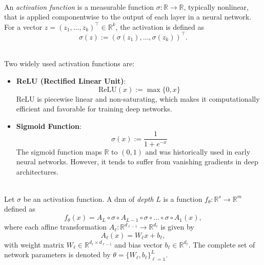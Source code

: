 \begin{definition} \ \\
An \emph{activation function} is a measurable function $\sigma : \mathbb{R} \to \mathbb{R}$, typically nonlinear, that is applied componentwise to the output of each layer in a neural network. For a vector $z = (z_1, \dots, z_k)^\top \in \mathbb{R}^k$, the activation is defined as
\begin{equation*}
    \sigma(z) := (\sigma(z_1), \dots, \sigma(z_k))^\top.
\end{equation*}
\end{definition}

\begin{example} \ \\
Two widely used activation functions are:
\begin{itemize}
    \item \textbf{ReLU (Rectified Linear Unit)}:
    \begin{equation*}
        \mathrm{ReLU}(x) := \max\{0, x\}
    \end{equation*}
    ReLU is piecewise linear and non-saturating, which makes it computationally
    efficient and favorable for training deep networks.

    \item \textbf{Sigmoid Function}:
    \begin{equation*}
        \sigma(x) := \frac{1}{1 + e^{-x}}
    \end{equation*}
    The sigmoid function maps $\mathbb{R}$ to $(0, 1)$ and was historically used
    in early neural networks. However, it tends to suffer from vanishing
    gradients in deep architectures.
\end{itemize}
\end{example}

\begin{definition} \ \\
Let $\sigma$ be an activation function. A \ac{dnn} of \emph{depth} $L$ is a
function $f_\theta: \mathbb{R}^s \to \mathbb{R}^m$ defined as
\begin{equation*}
    f_\theta(x) = A_L \circ \sigma \circ A_{L-1} \circ \sigma \circ \dots \circ \sigma \circ A_1(x),
\end{equation*}
where each affine transformation $A_\ell: \mathbb{R}^{d_{\ell-1}} \to
\mathbb{R}^{d_\ell}$ is given by
\begin{equation*}
    A_\ell(x) = W_\ell x + b_\ell,
\end{equation*}
with weight matrix $W_\ell \in \mathbb{R}^{d_\ell \times d_{\ell-1}}$ and bias
vector $b_\ell \in \mathbb{R}^{d_\ell}$. The complete set of network parameters
is denoted by $\theta = \{W_\ell, b_\ell\}_{\ell=1}^L$.
\end{definition}

